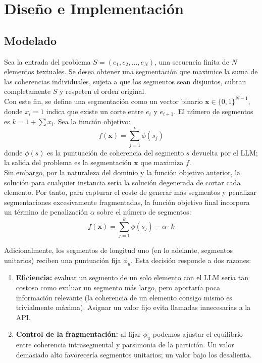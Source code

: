 \documentclass[letterpaper, 12pt]{report}
\begin{document}
\chapter{Diseño e Implementación}

\section{Modelado}

Sea la entrada del problema \(S = (e_1, e_2, \dots , e_N)\), una secuencia
finita de \(N\) elementos textuales. Se desea obtener una segmentación 
que maximice la suma de las coherencias individuales, sujeta a que los segmentos sean disjuntos, 
cubran completamente \(S\) y respeten el orden original. \\

Con este fin, se define una segmentación como un vector binario \(\mathbf{x} \in \{0,1\}^{N-1}\), donde \(x_i = 1\) indica que existe un corte entre \(e_i\) y \(e_{i+1}\). El número de segmentos es \(k = 1 + \sum x_i\). Sea la función objetivo:
\[
f(\mathbf{x}) = \sum_{j=1}^{k} \phi(s_j)
\]
donde \(\phi(s)\) es la puntuación de coherencia del segmento \(s\) devuelta por el LLM; la salida del problema es la segmentación \(\mathbf{x}\) que maximiza \(f\). \\

Sin embargo, por la naturaleza del dominio y la función objetivo anterior, la solución para cualquier instancia sería la solución degenerada de cortar cada elemento. Por tanto, para capturar el coste de generar más segmentos y penalizar segmentaciones excesivamente fragmentadas, la función objetivo final incorpora un término de penalización \(\alpha\) sobre el número de segmentos:
\[
f(\mathbf{x}) = \sum_{j=1}^{k} \phi(s_j) - \alpha \cdot k
\]

Adicionalmente, los segmentos de longitud uno (en lo adelante, segmentos unitarios) reciben una puntuación fija \(\phi_u\). Esta decisión responde a dos razones:
\begin{enumerate}
    \item \textbf{Eficiencia:} evaluar un segmento de un solo elemento con el LLM sería tan costoso como evaluar un segmento más largo, pero aportaría poca información relevante (la coherencia de un elemento consigo mismo es trivialmente máxima). Asignar un valor fijo evita llamadas innecesarias a la API.
    \item \textbf{Control de la fragmentación:} al fijar \(\phi_u\) podemos ajustar el equilibrio entre coherencia intrasegmental y parsimonia de la partición. Un valor demasiado alto favorecería segmentos unitarios; un valor bajo los desalienta.
\end{enumerate}
\end{document}

